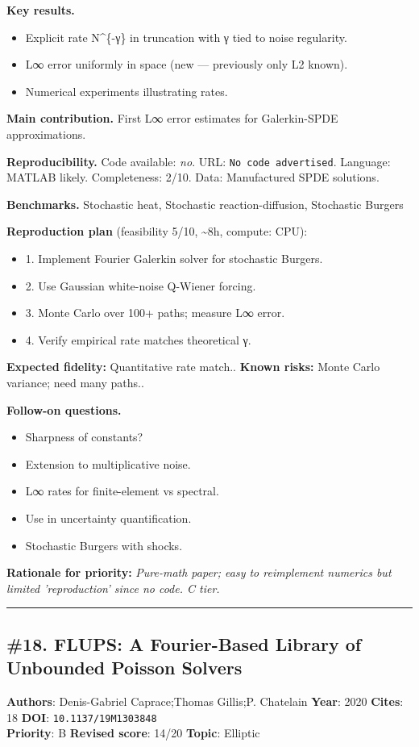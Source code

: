 \documentclass[10pt,letterpaper]{article}
\begin{document}
\textbf{Key results.}
\begin{itemize}
\item Explicit rate N\^{}\{-γ\} in truncation with γ tied to noise regularity.
\item L∞ error uniformly in space (new — previously only L2 known).
\item Numerical experiments illustrating rates.
\end{itemize}

\textbf{Main contribution.} First L∞ error estimates for Galerkin-SPDE approximations.

\textbf{Reproducibility.} Code available: \emph{no}. URL: \texttt{No code advertised}. Language: MATLAB likely. Completeness: 2/10. Data: Manufactured SPDE solutions.

\textbf{Benchmarks.} Stochastic heat, Stochastic reaction-diffusion, Stochastic Burgers

\textbf{Reproduction plan} (feasibility 5/10, \textasciitilde8h, compute: CPU):
\begin{itemize}
\item 1. Implement Fourier Galerkin solver for stochastic Burgers.
\item 2. Use Gaussian white-noise Q-Wiener forcing.
\item 3. Monte Carlo over 100+ paths; measure L∞ error.
\item 4. Verify empirical rate matches theoretical γ.
\end{itemize}
\textbf{Expected fidelity:} Quantitative rate match.. \textbf{Known risks:} Monte Carlo variance; need many paths..

\textbf{Follow-on questions.}
\begin{itemize}
\item Sharpness of constants?
\item Extension to multiplicative noise.
\item L∞ rates for finite-element vs spectral.
\item Use in uncertainty quantification.
\item Stochastic Burgers with shocks.
\end{itemize}

\textbf{Rationale for priority:} \emph{Pure-math paper; easy to reimplement numerics but limited 'reproduction' since no code. C tier.}

\medskip\hrule\medskip

\subsection*{\#18. FLUPS: A Fourier-Based Library of Unbounded Poisson Solvers}
\textbf{Authors}: Denis-Gabriel Caprace;Thomas Gillis;P. Chatelain \textbullet{} \textbf{Year}: 2020 \textbullet{} \textbf{Cites}: 18 \textbullet{} \textbf{DOI}: \texttt{10.1137/19M1303848} \\
\textbf{Priority}: B \textbullet{} \textbf{Revised score}: 14/20 \textbullet{} \textbf{Topic}: Elliptic
\end{document}
